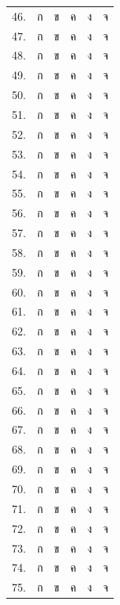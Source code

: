 \documentclass[12pt, a4paper]{exam}
\begin{document}
\begin{center}
\setlength{\tabcolsep}{20pt}
\renewcommand{\arraystretch}{1.35}
\begin{tabular}{l c c c c c}
46. & ก & ข & ค & ง & จ \\
47. & ก & ข & ค & ง & จ \\
48. & ก & ข & ค & ง & จ \\
49. & ก & ข & ค & ง & จ \\
50. & ก & ข & ค & ง & จ \\
51. & ก & ข & ค & ง & จ \\
52. & ก & ข & ค & ง & จ \\
53. & ก & ข & ค & ง & จ \\
54. & ก & ข & ค & ง & จ \\
55. & ก & ข & ค & ง & จ \\
56. & ก & ข & ค & ง & จ \\
57. & ก & ข & ค & ง & จ \\
58. & ก & ข & ค & ง & จ \\
59. & ก & ข & ค & ง & จ \\
60. & ก & ข & ค & ง & จ \\
61. & ก & ข & ค & ง & จ \\
62. & ก & ข & ค & ง & จ \\
63. & ก & ข & ค & ง & จ \\
64. & ก & ข & ค & ง & จ \\
65. & ก & ข & ค & ง & จ \\
66. & ก & ข & ค & ง & จ \\
67. & ก & ข & ค & ง & จ \\
68. & ก & ข & ค & ง & จ \\
69. & ก & ข & ค & ง & จ \\
70. & ก & ข & ค & ง & จ \\
71. & ก & ข & ค & ง & จ \\
72. & ก & ข & ค & ง & จ \\
73. & ก & ข & ค & ง & จ \\
74. & ก & ข & ค & ง & จ \\
75. & ก & ข & ค & ง & จ \\
\end{tabular}
\end{center}
\end{document}
